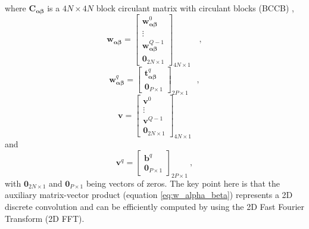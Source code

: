 \documentclass[manuscript,noblind]{geophysics}
\begin{document}
where $\mathbf{C}_{\boldsymbol{\alpha\beta}}$ is a $4N \times 4N$ 
block circulant matrix with circulant blocks (BCCB) \citep[e.g., ][ p. 184]{davis1979},
\begin{equation}
	\mathbf{w}_{\boldsymbol{\alpha\beta}} = \begin{bmatrix}
		\mathbf{w}_{\boldsymbol{\alpha\beta}}^{0} \\
		\vdots \\
		\mathbf{w}_{\boldsymbol{\alpha\beta}}^{Q - 1} \\
		\mathbf{0}_{2N \times 1}
	\end{bmatrix}_{4N \times 1} \quad ,
	\label{eq:w_alpha_beta_partitioned}
\end{equation}
\begin{equation}
	\mathbf{w}_{\boldsymbol{\alpha\beta}}^{q} = \begin{bmatrix}
		\mathbf{t}^{q}_{\boldsymbol{\alpha\beta}} \\
		\mathbf{0}_{P \times 1}
	\end{bmatrix}_{2P \times 1}
	\label{eq:wq-vector} \quad ,
\end{equation}
\begin{equation}
	\mathbf{v} = \begin{bmatrix}
		\mathbf{v}^{0} \\
		\vdots \\
		\mathbf{v}^{Q - 1} \\
		\mathbf{0}_{2N \times 1}
	\end{bmatrix}_{4N \times 1}
	\label{eq:v-vector}
\end{equation}
and
\begin{equation}
	\mathbf{v}^{q} = \begin{bmatrix}
		\mathbf{b}^{q} \\
		\mathbf{0}_{P \times 1}
	\end{bmatrix}_{2P \times 1} \: ,
	\label{eq:vq-vector} 
\end{equation}
with $\mathbf{0}_{2N \times 1}$ and $\mathbf{0}_{P \times 1}$ being vectors of zeros.
The key point here is that the auxiliary matrix-vector product
(equation \ref{eq:w_alpha_beta}) represents a 2D discrete convolution and can be 
efficiently computed by using the 2D Fast Fourier Transform (2D FFT). 
\end{document}

